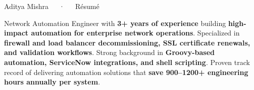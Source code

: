 \documentclass[11pt, a4paper]{awesome-cv}
\begin{document}
\makecvheader[C]

\makecvfooter
  {Aditya Mishra~~~·~~~Résumé}
  {\thepage}

\vspace{-1.0em}

\begin{cvparagraph}
Network Automation Engineer with \textbf{3+ years of experience} building \textbf{high-impact automation for enterprise network operations}. Specialized in \textbf{firewall and load balancer decommissioning, SSL certificate renewals, and validation workflows}. Strong background in \textbf{Groovy-based automation, ServiceNow integrations, and shell scripting}. Proven track record of delivering automation solutions that \textbf{save 900–1200+ engineering hours annually per system}.
\end{cvparagraph}

\vspace{-1.0em}

\vspace{-0.5em}
\end{document}
